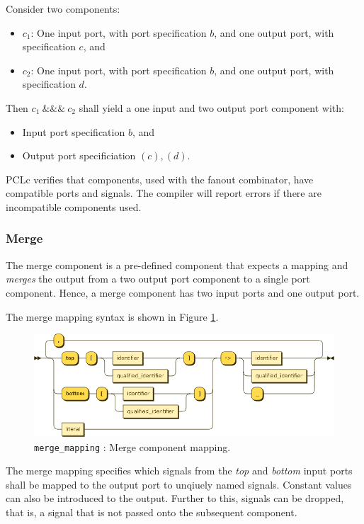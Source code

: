 Consider two components:
\begin{itemize}
\item $c_1$: One input port, with port specification $b$, and one output port, with specification $c$, and
\item $c_2$: One input port, with port specification $b$, and one output port, with specification $d$.
\end{itemize}
Then $c_1\ \&\&\&\ c_2$ shall yield a one input and two output port component with:
\begin{itemize}
\item Input port specification $b$, and
\item Output port specificiation $(c), (d)$.
\end{itemize}

PCLc verifies that components, used with the fanout combinator, have compatible ports and signals. The compiler will report errors if there are incompatible components used.

\subsubsection{Merge}
The merge component is a pre-defined component that expects a mapping and \emph{merges} the output from a two output port component to a single port component. Hence, a merge component has two input ports and one output port.

The merge mapping syntax is shown in Figure \ref{fig:pcl-merge-mapping}.
\begin{figure}[h!]
  \centering
    \includegraphics[scale=\DiagramScale,angle=90]{chapters/compiler/diagrams/merge_mapping}
  \caption{\texttt{merge\_mapping} : Merge component mapping.}
  \label{fig:pcl-merge-mapping}
\end{figure}
The merge mapping specifies which signals from the \emph{top} and \emph{bottom} input ports shall be mapped to the output port to unqiuely named signals. Constant values can also be introduced to the output. Further to this, signals can be dropped, that is, a signal that is not passed onto the subsequent component.

